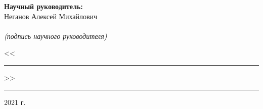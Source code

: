 \documentclass[a4paper,oneside,final,12pt,russian]{extarticle}
\begin{document}
\hspace{90mm}
\begin{minipage}{0.4\textwidth}
\begin{flushleft}
\textbf{Научный руководитель:}\\Неганов Алексей Михайлович\\
\vspace{4mm} \hrulefill \\
{\centering\scriptsize\textit{(подпись научного руководителя)}\\}
\end{flushleft}
\begin{flushright}
<<\rule{10mm}{0.4pt}>>\rule{30mm}{0.4pt} 2021 г.
\end{flushright}    
\end{minipage}

\thispagestyle{empty}
\end{document}
